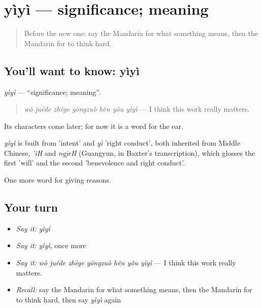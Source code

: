 \section[yìyì]{yìyì — significance; meaning}

\label{lesson:ZH-C347-yiyi}



\begin{quote}
Before the new one: say the Mandarin for what something means, then the Mandarin for to think hard.
\end{quote}

\subsection*{You'll want to know: yìyì}
\emph{yìyì} — \textquotedblleft{}significance; meaning\textquotedblright{}.

\begin{quote}
\emph{wǒ juéde zhège gōngzuò hěn yǒu yìyì} — I think this work really matters.
\end{quote}

Its characters come later; for now it is a word for the ear.

\begin{cousinweb}
\emph{yìyì} is built from  'intent' and \emph{yì} 'right conduct', both inherited from Middle Chinese, \emph{'iH} and \emph{ngjeH} (Guangyun, in Baxter's transcription), which glosses the first 'will' and the second 'benevolence and right conduct'.
\end{cousinweb}

\begin{grammarlens}[title={What you've built}]
One more word for giving reasons.
\end{grammarlens}

\subsection*{Your turn}
\begin{itemize}
\raggedright
  \item \emph{Say it:} \emph{yìyì}
  \item \emph{Say it:} \emph{yìyì}, once more
  \item \emph{Say it:} \emph{wǒ juéde zhège gōngzuò hěn yǒu yìyì} — I think this work really matters.
  \item \emph{Recall:} say the Mandarin for what something means, then the Mandarin for to think hard, then say \emph{yìyì} again
\end{itemize}

